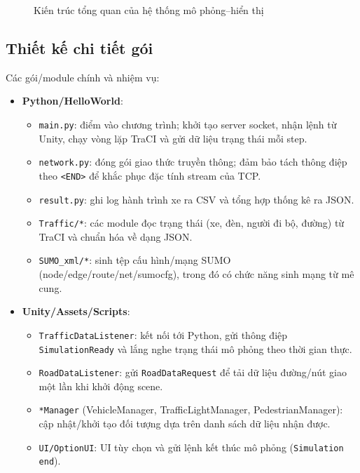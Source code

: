 \documentclass[../DoAn.tex]{subfiles}
\begin{document}
\begin{figure}[htbp]
	\centering
	\caption{Kiến trúc tổng quan của hệ thống mô phỏng--hiển thị}
	\label{fig:arch_overview}
\end{figure}

\subsection{Thiết kế chi tiết gói}
Các gói/module chính và nhiệm vụ:
\begin{itemize}
	\item \textbf{Python/HelloWorld}:
	\begin{itemize}
		\item \texttt{main.py}: điểm vào chương trình; khởi tạo server socket, nhận lệnh từ Unity, chạy vòng lặp TraCI và gửi dữ liệu trạng thái mỗi step.
		\item \texttt{network.py}: đóng gói giao thức truyền thông; đảm bảo tách thông điệp theo \texttt{<END>} để khắc phục đặc tính stream của TCP.
		\item \texttt{result.py}: ghi log hành trình xe ra CSV và tổng hợp thống kê ra JSON.
		\item \texttt{Traffic/*}: các module đọc trạng thái (xe, đèn, người đi bộ, đường) từ TraCI và chuẩn hóa về dạng JSON.
		\item \texttt{SUMO\_xml/*}: sinh tệp cấu hình/mạng SUMO (node/edge/route/net/sumocfg), trong đó có chức năng sinh mạng từ mê cung.
	\end{itemize}
	\item \textbf{Unity/Assets/Scripts}:
	\begin{itemize}
		\item \texttt{TrafficDataListener}: kết nối tới Python, gửi thông điệp \texttt{SimulationReady} và lắng nghe trạng thái mô phỏng theo thời gian thực.
		\item \texttt{RoadDataListener}: gửi \texttt{RoadDataRequest} để tải dữ liệu đường/nút giao một lần khi khởi động scene.
		\item \texttt{*Manager} (VehicleManager, TrafficLightManager, PedestrianManager): cập nhật/khởi tạo đối tượng dựa trên danh sách dữ liệu nhận được.
		\item \texttt{UI/OptionUI}: UI tùy chọn và gửi lệnh kết thúc mô phỏng (\texttt{Simulation end}).
	\end{itemize}
\end{itemize}
\end{document}
